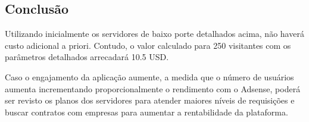 \subsection{Conclusão}
Utilizando inicialmente os servidores de baixo porte detalhados acima, não haverá custo adicional a priori.
Contudo, o valor calculado para 250 visitantes com os parâmetros detalhados arrecadará 10.5
USD.

Caso o engajamento da aplicação aumente, a medida que o número de usuários aumenta
incrementando proporcionalmente o rendimento com o Adsense, poderá ser revisto os planos dos
servidores para atender maiores níveis de requisições e buscar contratos com empresas para aumentar 
a rentabilidade da plataforma.


